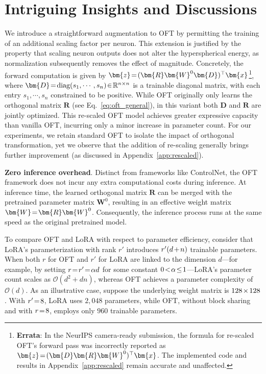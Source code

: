 \section{Intriguing Insights and Discussions}

We introduce a straightforward augmentation to OFT by permitting the training of an additional scaling factor per neuron. This extension is justified by the property that scaling neuron outputs does not alter the hyperspherical energy, as normalization subsequently removes the effect of magnitude. Concretely, the forward computation is given by $\thickmuskip=2mu \medmuskip=2mu\bm{z}=(\bm{R}\bm{W}^0\bm{D})^\top\bm{x}$\footnote{\textbf{Errata}: In the NeurIPS camera-ready submission, the formula for re-scaled OFT's forward pass was incorrectly reported as $\thickmuskip=2mu \medmuskip=2mu\bm{z}=(\bm{D}\bm{R}\bm{W}^0)^\top\bm{x}$. The implemented code and results in Appendix~\ref{app:rescaled} remain accurate and unaffected.}, where $\thickmuskip=2mu \medmuskip=2mu \bm{D}=\text{diag}(s_1,\cdots,s_n)\in\mathbb{R}^{n\times n}$ is a trainable diagonal matrix, with each entry $s_1,\cdots,s_n$ constrained to be positive. While OFT originally only learns the orthogonal matrix $\bm{R}$ (see Eq.~\eqref{eq:oft_general}), in this variant both $\bm{D}$ and $\bm{R}$ are jointly optimized. This re-scaled OFT model achieves greater expressive capacity than vanilla OFT, incurring only a minor increase in parameter count. For our experiments, we retain standard OFT to isolate the impact of orthogonal transformation, yet we observe that the addition of re-scaling generally brings further improvement (as discussed in Appendix~\ref{app:rescaled}).

\textbf{Zero inference overhead}. Distinct from frameworks like ControlNet, the OFT framework does not incur any extra computational costs during inference. At inference time, the learned orthogonal matrix $\bm{R}$ can be merged with the pretrained parameter matrix $\bm{W}^0$, resulting in an effective weight matrix $\thickmuskip=2mu \medmuskip=2mu \bm{W}=\bm{R}\bm{W}^0$. Consequently, the inference process runs at the same speed as the original pretrained model.

To compare OFT and LoRA with respect to parameter efficiency, consider that LoRA's parameterization with rank $r'$ introduces $\thickmuskip=2mu \medmuskip=2mu r'(d+n)$ trainable parameters. When both $r$ for OFT and $r'$ for LoRA are linked to the dimension $d$—for example, by setting $\thickmuskip=2mu \medmuskip=2mu r=r'=\alpha d$ for some constant $\thickmuskip=2mu \medmuskip=2mu 0<\alpha\leq 1$—LoRA's parameter count scales as $\mathcal{O}(d^2+dn)$, whereas OFT achieves a parameter complexity of $\mathcal{O}(d)$. As an illustrative case, suppose the underlying weight matrix is $\thickmuskip=2mu \medmuskip=2mu 128\times 128$. With $\thickmuskip=2mu \medmuskip=2mu r'=8$, LoRA uses $2,048$ parameters, while OFT, without block sharing and with $\thickmuskip=2mu \medmuskip=2mu r=8$, employs only $960$ trainable parameters.


